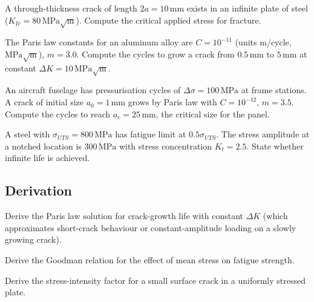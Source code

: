 \begin{exercise}
A through-thickness crack of length $2a = 10\,\text{mm}$ exists in an infinite plate of steel ($K_{Ic} = 80\,\text{MPa}\sqrt{\text{m}}$). Compute the critical applied stress for fracture.
\end{exercise}

\begin{exercise}
The Paris law constants for an aluminum alloy are $C = 10^{-11}$ (units $\text{m/cycle}$, $\text{MPa}\sqrt{\text{m}}$), $m = 3.0$. Compute the cycles to grow a crack from $0.5\,\text{mm}$ to $5\,\text{mm}$ at constant $\Delta K = 10\,\text{MPa}\sqrt{\text{m}}$.
\end{exercise}

\begin{exercise}
An aircraft fuselage has pressurisation cycles of $\Delta \sigma = 100\,\text{MPa}$ at frame stations. A crack of initial size $a_0 = 1\,\text{mm}$ grows by Paris law with $C = 10^{-12}$, $m = 3.5$. Compute the cycles to reach $a_c = 25\,\text{mm}$, the critical size for the panel.
\end{exercise}

\begin{exercise}
A steel with $\sigma_{UTS} = 800\,\text{MPa}$ has fatigue limit at $0.5 \sigma_{UTS}$. The stress amplitude at a notched location is $300\,\text{MPa}$ with stress concentration $K_t = 2.5$. State whether infinite life is achieved.
\end{exercise}

\subsection*{Derivation}

\begin{exercise}
Derive the Paris law solution for crack-growth life with constant $\Delta K$ (which approximates short-crack behaviour or constant-amplitude loading on a slowly growing crack).
\end{exercise}

\begin{exercise}
Derive the Goodman relation for the effect of mean stress on fatigue strength.
\end{exercise}

\begin{exercise}
Derive the stress-intensity factor for a small surface crack in a uniformly stressed plate.
\end{exercise}


